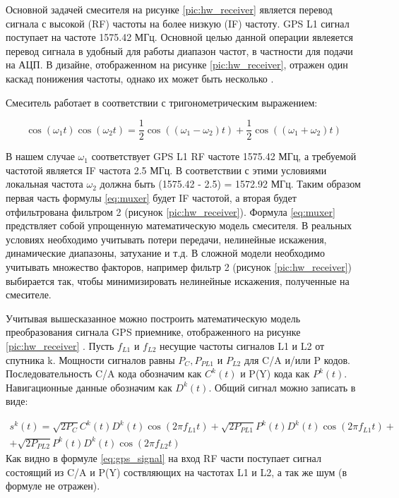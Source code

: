 Основной задачей смесителя на рисунке \ref{pic:hw_receiver} является перевод сигнала с высокой (RF) частоты на более низкую (IF)
частоту. GPS L1 сигнал поступает на частоте 1575.42 МГц. Основной целью данной операции явлеяется перевод сигнала
в удобный для работы диапазон частот, в частности для подачи на АЦП. В дизайне, отображенном на рисунке \ref{pic:hw_receiver},
отражен один каскад понижения частоты, однако их может быть несколько \cite{gps}. 

Смеситель работает в соответствии с тригонометрическим выражением:

\begin{equation}
\cos(\omega_1 t)\cos(\omega_2 t) = 
	\frac{1}{2}\cos((\omega_1 - \omega_2)t) + \frac{1}{2}\cos((\omega_1 + \omega_2)t)
\label{eq:muxer}
\end{equation}

В нашем случае ${\omega_1}$ соответствует GPS L1 RF частоте 1575.42 МГц, а требуемой частотой является IF частота 2.5 МГц. В соответствии 
с этими условиями локальная частота ${\omega_2}$ должна быть (1575.42 - 2.5) = 1572.92 МГц. Таким образом первая часть формулы
\ref{eq:muxer} будет IF частотой, а вторая будет отфильтрована фильтром 2 (рисунок \ref{pic:hw_receiver}). Формула \ref{eq:muxer} 
предствляет собой упрощенную математическую модель смесителя. В реальных условиях необходимо учитывать потери передачи, нелинейные
искажения, динамические диапазоны, затухание и т.д. В сложной модели необходимо учитывать множество факторов, например
фильтр 2 (рисунок \ref{pic:hw_receiver}) выбирается так, чтобы минимизировать нелинейные искажения, полученные на смесителе.

Учитывая вышесказанное можно построить математическую модель преобразования сигнала GPS приемнике,
отображенного на рисунке \ref{pic:hw_receiver} \cite{gps}.
Пусть ${f_{L1}}$ и ${f_{L2}}$ несущие частоты сигналов L1 и L2 от спутника k. Мощности сигналов равны  ${P_C, P_{PL1}}$ и
${P_{L2}}$ для C/A и/или P кодов. Последовательность C/A кода обозначим как ${C^k(t)}$ и P(Y) кода как ${P^k(t)}$.
Навигационные данные обозначим как ${D^k(t)}$. Общий сигнал можно записать в виде:

\begin{eqnarray}
s^k(t) =	\sqrt{2P_C} C^k(t) D^k(t) \cos(2 \pi f_{L1} t) +
		\sqrt{2P_{PL1}} P^k(t) D^k(t) \cos(2 \pi f_{L1} t) + \nonumber \\
		+ \sqrt{2P_{PL2}} P^k(t) D^k(t) \cos(2 \pi f_{L2} t)
\label{eq:gps_signal}
\end{eqnarray}
Как видно в формуле \ref{eq:gps_signal} на вход RF части поступает сигнал состоящий из C/A и P(Y) 
соствляющих на частотах L1 и L2, а так же шум (в формуле не отражен).

